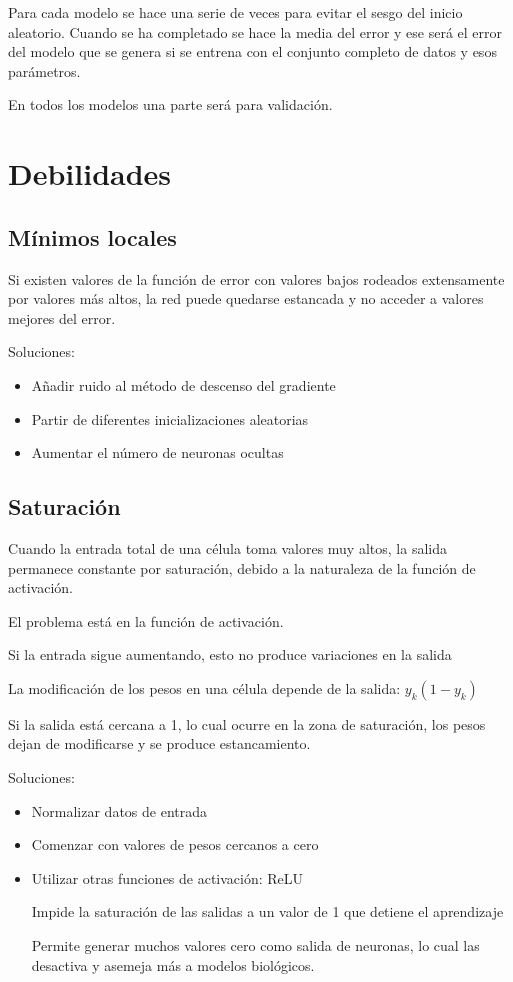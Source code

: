 \documentclass[12pt, twoside, openright]{report} %
\begin{document}
Para cada modelo se hace una serie de veces para evitar el sesgo del inicio aleatorio. Cuando se ha completado se hace la media del error y ese será el error del modelo que se genera si se entrena con el conjunto completo de datos y esos parámetros.

En todos los modelos una parte será para validación.

\section{Debilidades}
\subsection{Mínimos locales}
Si existen valores de la función de error con valores bajos rodeados extensamente por valores más altos, la red puede quedarse estancada y no acceder a valores mejores del error.

Soluciones:
\begin{itemize}
	\item Añadir ruido al método de descenso del gradiente
	\item Partir de diferentes inicializaciones aleatorias
	\item Aumentar el número de neuronas ocultas
\end{itemize}

\subsection{Saturación}
Cuando la entrada total de una célula toma valores muy altos, la salida permanece constante por saturación, debido a la naturaleza de la función de activación.

El problema está en la función de activación.

Si la entrada sigue aumentando, esto no produce variaciones en la salida

La modificación de los pesos en una célula depende de la salida: $y_k(1 - y_k)$

Si la salida está cercana a 1, lo cual ocurre en la zona de saturación, los pesos dejan de modificarse y se produce estancamiento.

Soluciones:
\begin{itemize}
	\item Normalizar datos de entrada
	\item Comenzar con valores de pesos cercanos a cero
	\item Utilizar otras funciones de activación: ReLU
	
	Impide la saturación de las salidas a un valor de 1 que detiene el aprendizaje
	
	Permite generar muchos valores cero como salida de neuronas, lo cual las desactiva y asemeja más a modelos biológicos.
\end{itemize}
\end{document}
